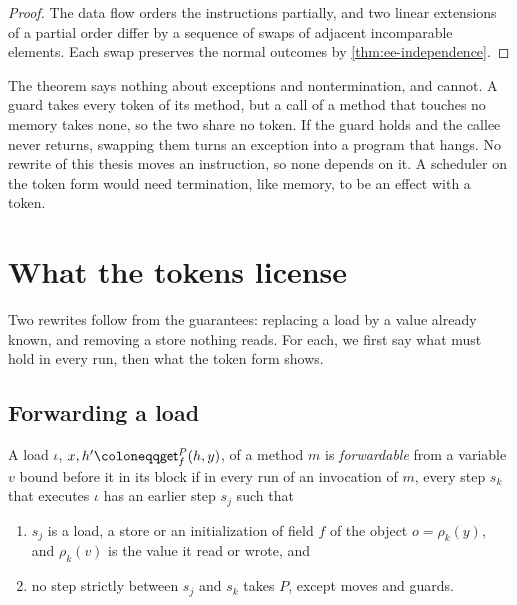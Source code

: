 \begin{proof}
The data flow orders the instructions partially, and two linear extensions of
a partial order differ by a sequence of swaps of adjacent incomparable
elements. Each swap preserves the normal outcomes by
\cref{thm:ee-independence}.
\end{proof}

\begin{remark}\label{rem:ee-abnormal}
The theorem says nothing about exceptions and nontermination, and cannot. A
guard takes every token of its method, but a call of a method that touches no
memory takes none, so the two share no token. If the guard holds and the callee
never returns, swapping them turns an exception into a program that hangs. No rewrite of
this thesis moves an instruction, so none depends on it. A scheduler on the
token form would need termination, like memory, to be an effect with a
token.
\end{remark}

\section{What the tokens license}\label{sec:ee-license}

Two rewrites follow from the guarantees: replacing a load by a value already
known, and removing a store nothing reads. For each, we first say what must hold
in every run, then what the token form shows.

\subsection{Forwarding a load}

\begin{definition}\label{def:ee-forwardable}
A load $\iota$, $x, h' \coloneqq \getf{f}{P}(h, y)$, of a method $m$ is
\emph{forwardable} from a variable $v$ bound before it in its block if in every
run of an invocation of $m$, every step $s_k$ that executes $\iota$ has an
earlier step $s_j$ such that
\begin{enumerate}
\item $s_j$ is a load, a store or an initialization of field $f$ of the object
  $o = \rho_k(y)$, and $\rho_k(v)$ is the value it read or wrote, and
\item no step strictly between $s_j$ and $s_k$ takes $P$, except moves and
  guards.
\end{enumerate}
\end{definition}

